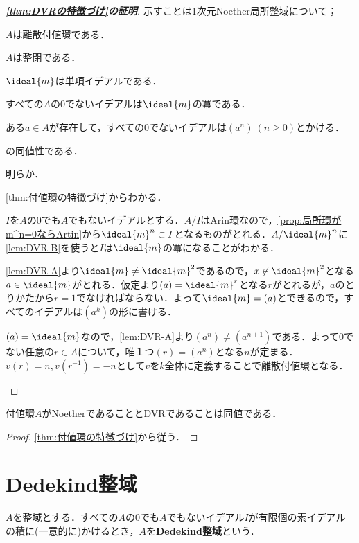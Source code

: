 \begin{proof}[\textbf{\ref{thm:DVRの特徴づけ}の証明}]
	示すことは1次元Noether局所整域について；
	\begin{sakura}
		\item $A$は離散付値環である．
		\item $A$は整閉である．
		\item $\ideal{m}$は単項イデアルである．
		\item すべての$A$の0でないイデアルは$\ideal{m}$の冪である．
		\item ある$a\in A$が存在して，すべての0でないイデアルは$(a^n)~ (n\geq0)$とかける．
	\end{sakura}
	の同値性である．
	\begin{eqv}[5]
		\item 明らか．
		\item \ref{thm:付値環の特徴づけ}からわかる．
		\item $I$を$A$の$0$でも$A$でもないイデアルとする．$A/I$はArin環なので，\ref{prop:局所環がm^n=0ならArtin}から$\ideal{m}^n\subset I$となるものがとれる．$A/\ideal{m}^n$に\ref{lem:DVR-B}を使うと$I$は$\ideal{m}$の冪になることがわかる．
		
		\item \ref{lem:DVR-A}より$\ideal{m}\neq\ideal{m}^2$であるので，$x\not\in\ideal{m}^2$となる$a\in\ideal{m}$がとれる．仮定より$(a)=\ideal{m}^r$となる$r$がとれるが，$a$のとりかたから$r=1$でなければならない．よって$\ideal{m}=(a)$とできるので，すべてのイデアルは$(a^k)$の形に書ける．
		
		\item $(a)=\ideal{m}$なので，\ref{lem:DVR-A}より$(a^n)\neq(a^{n+1})$である．よって0でない任意の$r\in A$について，唯１つ$(r)=(a^n)$となる$n$が定まる．$v(r)=n,v(r^{-1})=-n$として$v$を$k$全体に定義することで離散付値環となる．
	\end{eqv}
\end{proof}

\begin{cor}
	付値環$A$がNoetherであることとDVRであることは同値である．
\end{cor}

\begin{proof}
	\ref{thm:付値環の特徴づけ}から従う．
\end{proof}
\section{Dedekind整域}

\begin{defi}[Dedekind整域]
	$A$を整域とする．すべての$A$の0でも$A$でもないイデアル$I$が有限個の素イデアルの積に(一意的に)かけるとき，$A$を\textbf{Dedekind整域}という．
\end{defi}

